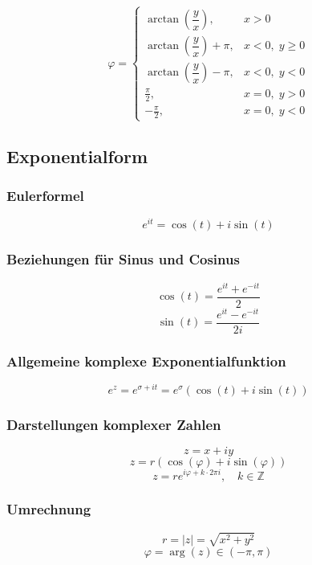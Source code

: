 \documentclass[9pt,a4paper]{article}
\begin{document}
    \[
    \varphi =
    \begin{cases}
        \arctan\left(\dfrac{y}{x}\right), & x > 0 \\[1em]
        \arctan\left(\dfrac{y}{x}\right) + \pi, & x < 0,\; y \ge 0 \\[1em]
        \arctan\left(\dfrac{y}{x}\right) - \pi, & x < 0,\; y < 0 \\[1em]
        \frac{\pi}{2}, & x = 0,\; y > 0 \\[0.5em]
        -\frac{\pi}{2}, & x = 0,\; y < 0
    \end{cases}
    \]
    
    
    \subsection{Exponentialform}
    
    \subsubsection{Eulerformel}
    \[
    e^{it} = \cos(t) + i\sin(t)
    \]
    
    \subsubsection{Beziehungen für Sinus und Cosinus}
    \[
    \cos(t)=\frac{e^{it}+e^{-it}}{2}
    \]
    \[
    \sin(t)=\frac{e^{it}-e^{-it}}{2i}
    \]
    
    \subsubsection{Allgemeine komplexe Exponentialfunktion}
    \[
    e^z = e^{\sigma+it}=e^\sigma(\cos(t)+i\sin(t))
    \]
    
    \subsubsection{Darstellungen komplexer Zahlen}
    \[
    z = x + iy
    \]
    \[
    z = r(\cos(\varphi)+i\sin(\varphi))
    \]
    \[
    z = re^{i\varphi + k\cdot 2\pi i}, \quad k\in\mathbb{Z}
    \]
    
    \subsubsection{Umrechnung}
    \[
    r = |z| = \sqrt{x^2+y^2}
    \]
    \[
    \varphi = \arg(z)\in(-\pi,\pi)
    \]
    
\end{document}
